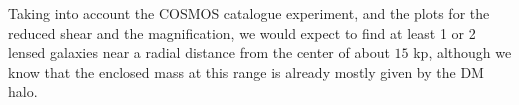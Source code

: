 Taking into account the COSMOS catalogue experiment, and the plots for the reduced shear and the magnification, we would expect to find at least 1 or 2 lensed galaxies near a radial distance from the center of about $15$ kp, although we know that the enclosed mass at this range is already mostly given by the DM halo. 

